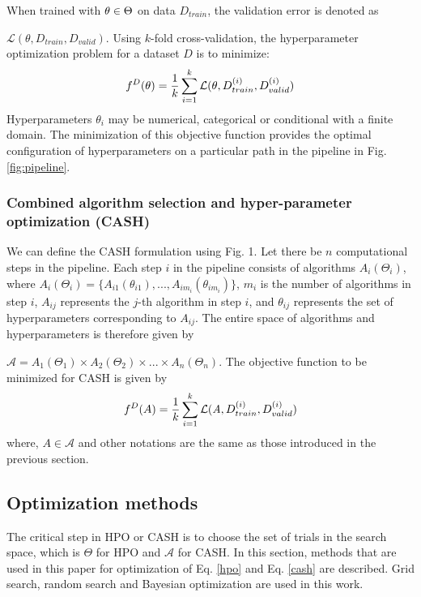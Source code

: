 When trained with $\emph{$\theta$} \in \textbf{$\Theta$}$ on data $D_{train}$, the validation error is denoted as \par
\noindent $\mathcal{L}(\theta, D_{train}, D_{valid})$. Using $k$-fold cross-validation, the hyperparameter optimization problem for a dataset $D$ is to minimize:
\begin{equation}
\label{hpo}
f^D(\theta) = \frac{1}{k}\sum_{i=1}^{k} \mathcal{L}(\emph{$\theta$}, D_{train}^{(i)}, D_{valid}^{(i)}) 
\end{equation}
Hyperparameters $\theta_i$ may be numerical, categorical or conditional with a finite domain. The minimization of this objective function provides the optimal configuration of hyperparameters on a particular path in the pipeline in Fig. \ref{fig:pipeline}.

\subsubsection{Combined algorithm selection and hyper-parameter optimization (CASH)}
\label{subsubsec_CASH}
We can define the CASH formulation using Fig. 1. Let there be $n$ computational steps in the pipeline. Each step $i$ in the pipeline consists of algorithms $A_i(\Theta_i)$, where $A_i(\Theta_i) = \{A_{i1}(\theta_{i1}), ..., A_{im_{i}}(\theta_{im_{i}})\}$, $m_{i}$ is the number of algorithms in step $i$, $A_{ij}$ represents the $j$-th algorithm in step $i$, and \textbf{$\theta_{ij}$} represents the set of hyperparameters corresponding to  $A_{ij}$. The entire space of algorithms and hyperparameters is therefore given by \par
\noindent $\mathcal{A} = A_1(\Theta_1) \times A_2(\Theta_2) \times ... \times A_n(\Theta_n)$. The objective function to be minimized for CASH is given by
\begin{equation}
\label{cash}
f^D(A) = \frac{1}{k}\sum_{i=1}^{k} \mathcal{L}(\emph{A}, D_{train}^{(i)}, D_{valid}^{(i)}) 
\end{equation}
where, $A \in \mathcal{A}$ and other notations are the same as those introduced in the previous section.

\subsection{Optimization methods}
The critical step in HPO or CASH is to choose the set of trials in the search space, which is $\Theta$ for HPO and $\mathcal{A}$ for CASH. In this section, methods that are used in this paper for optimization of Eq. \ref{hpo} and Eq. \ref{cash} are described. Grid search, random search and Bayesian optimization are used in this work.
